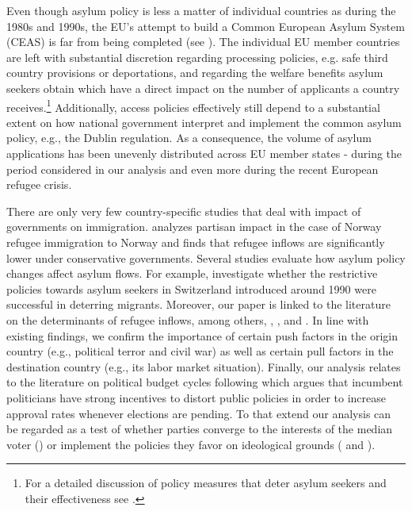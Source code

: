 \documentclass[a4paper,12pt]{article}
\begin{document}

Even though asylum policy is less a matter of individual countries as during the 1980s and 1990s, the EU's attempt to build a Common European Asylum System (CEAS) is far from being completed (see \citet{hatton2015EU}). The individual EU member countries are left with substantial discretion regarding processing policies, e.g. safe third country provisions or deportations, and regarding the welfare benefits asylum seekers obtain which have a direct impact on the number of applicants a country receives.\footnote{For a detailed discussion of policy measures that deter asylum seekers and their effectiveness see \citet{thielemann2006}.} Additionally, access policies effectively still depend to a substantial extent on how national government interpret and implement the common asylum policy, e.g., the Dublin regulation. As a consequence, the volume of asylum applications has been unevenly distributed across EU member states - during the period considered in our analysis and even more during the recent European refugee crisis.

There are only very few country-specific studies that deal with impact of governments on immigration. \citet{gudbrandsen2010} analyzes partisan impact in the case of Norway refugee immigration to Norway and finds that refugee inflows are significantly lower under conservative governments. Several studies evaluate how asylum policy changes affect asylum flows. For example, \citet{holzer2000} investigate whether the restrictive policies towards asylum seekers in Switzerland introduced around 1990 were successful in deterring migrants. Moreover, our paper is linked to the literature on the determinants of refugee inflows, among others, \citet{neumayer2005}, \citet{moore2007}, \citet{hatton2009} and \citet{hatton2016}. In line with existing findings, we confirm the importance of certain push factors in the origin country (e.g., political terror and civil war) as well as certain pull factors in the destination country (e.g., its labor market situation). Finally, our analysis relates to the literature on political budget cycles following \citet{nor75} which argues that incumbent politicians have strong incentives to distort public policies in order to increase approval rates whenever elections are pending. To that extend our analysis can be regarded as a test of whether parties converge to the interests of the median voter (\citet{downs1957}) or implement the policies they favor on ideological grounds (\citet{hibbs1977} and \citet{alesina1987}).
\end{document}
